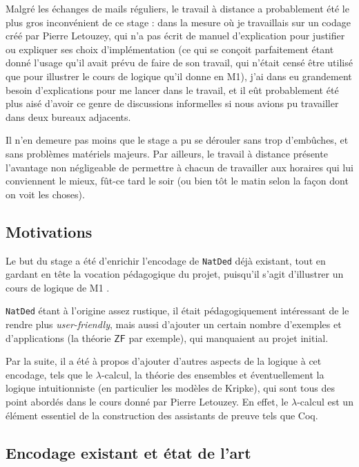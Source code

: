 \documentclass[a4paper]{article}
\newcommand{\ZF}{\mathsf{ZF}}
\theoremstyle{remark}
\theoremstyle{remark}
\theoremstyle{remark}
\theoremstyle{definition}
\theoremstyle{definition}
\theoremstyle{definition}
\begin{document}
Malgré les échanges de mails réguliers, le travail à distance a probablement été le plus gros inconvénient de ce stage : dans la mesure où je travaillais sur un codage créé par Pierre Letouzey, qui n'a pas écrit de manuel d'explication pour justifier ou expliquer ses choix d'implémentation (ce qui se conçoit parfaitement étant donné l'usage qu'il avait prévu de faire de son travail, qui n'était censé être utilisé que pour illustrer le cours de logique qu'il donne en M1), j'ai dans eu grandement besoin d'explications pour me lancer dans le travail, et il eût probablement été plus aisé d'avoir ce genre de discussions informelles si nous avions pu travailler dans deux bureaux adjacents.

Il n'en demeure pas moins que le stage a pu se dérouler sans trop d'embûches, et sans problèmes matériels majeurs. Par ailleurs, le travail à distance présente l'avantage non négligeable de permettre à chacun de travailler aux horaires qui lui conviennent le mieux, fût-ce tard le soir (ou bien tôt le matin selon la façon dont on voit les choses).

\subsection{Motivations}

Le but du stage a été d'enrichir l'encodage de \verb+NatDed+ déjà existant, tout en gardant en tête la vocation pédagogique du projet, puisqu'il s'agit d'illustrer un cours de logique de M1 \cite{poly}.

\verb+NatDed+ étant à l'origine assez rustique, il était pédagogiquement intéressant de le rendre plus \textit{user-friendly}, mais aussi d'ajouter un certain nombre d'exemples et d'applications (la théorie $\ZF$ par exemple), qui manquaient au projet initial.

Par la suite, il a été à propos d'ajouter d'autres aspects de la logique à cet encodage, tels que le $\lambda$-calcul, la théorie des ensembles et éventuellement la logique intuitionniste (en particulier les modèles de Kripke), qui sont tous des point abordés dans le cours donné par Pierre Letouzey. En effet, le $\lambda$-calcul est un élément essentiel de la construction des assistants de preuve tels que Coq.

\subsection{Encodage existant et état de l'art}
\end{document}
